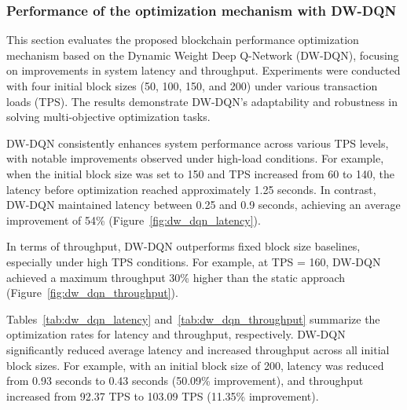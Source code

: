 \documentclass[a4paper,fleqn]{cas-dc}
\begin{document}


\subsubsection{Performance of the optimization mechanism with DW-DQN}
\vspace{6pt}
This section evaluates the proposed blockchain performance optimization mechanism based on the Dynamic Weight Deep Q-Network (DW-DQN), focusing on improvements in system latency and throughput. Experiments were conducted with four initial block sizes (50, 100, 150, and 200) under various transaction loads (TPS). The results demonstrate DW-DQN's adaptability and robustness in solving multi-objective optimization tasks.


DW-DQN consistently enhances system performance across various TPS levels, with notable improvements observed under high-load conditions. For example, when the initial block size was set to 150 and TPS increased from 60 to 140, the latency before optimization reached approximately 1.25 seconds. In contrast, DW-DQN maintained latency between 0.25 and 0.9 seconds, achieving an average improvement of 54\% (Figure~\ref{fig:dw_dqn_latency}). 

In terms of throughput, DW-DQN outperforms fixed block size baselines, especially under high TPS conditions. For example, at TPS = 160, DW-DQN achieved a maximum throughput 30\% higher than the static approach (Figure~\ref{fig:dw_dqn_throughput}). 

Tables~\ref{tab:dw_dqn_latency} and~\ref{tab:dw_dqn_throughput} summarize the optimization rates for latency and throughput, respectively. DW-DQN significantly reduced average latency and increased throughput across all initial block sizes. For example, with an initial block size of 200, latency was reduced from 0.93 seconds to 0.43 seconds (50.09\% improvement), and throughput increased from 92.37 TPS to 103.09 TPS (11.35\% improvement).
\end{document}
